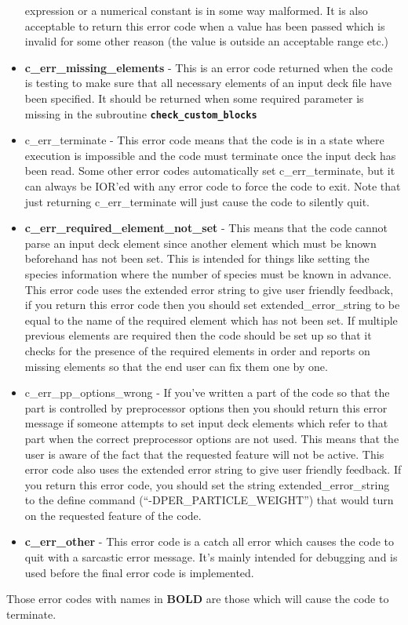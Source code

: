\documentclass[12pt,a4paper]{article}
\newcommand{\inlinecode}[1]{{\color{warwickred} \bf\texttt{#1}}}
\begin{document}
\begin{itemize}
  expression or a numerical constant is in some way malformed. It is also
  acceptable to return this error code when a value has been passed which is
  invalid for some other reason (the value is outside an acceptable range etc.)
\item {\bf c\_err\_missing\_elements} - This is an error code returned when the
  code is testing to make sure that all necessary elements of an input deck
  file have been specified. It should be returned when some required parameter
  is missing in the subroutine \inlinecode{check\_custom\_blocks}
\item c\_err\_terminate - This error code means that the code is in a state where
  execution is impossible and the code must terminate once the input deck has
  been read. Some other error codes automatically set c\_err\_terminate, but it
  can always be IOR'ed with any error code to force the code to exit. Note that
  just returning c\_err\_terminate will just cause the code to silently quit.
\item {\bf c\_err\_required\_element\_not\_set} - This means that the code cannot
  parse an input deck element since another element which must be known
  beforehand has not been set. This is intended for things like setting the
  species information where the number of species must be known in
  advance. This error code uses the extended error string to give user friendly
  feedback, if you return this error code then you should set
  extended\_error\_string to be equal to the name of the required element which
  has not been set. If multiple previous elements are required then the code
  should be set up so that it checks for the presence of the required elements
  in order and reports on missing elements so that the end user can fix them
  one by one.
\item c\_err\_pp\_options\_wrong - If you've written a part of the code so that
  the part is controlled by preprocessor options then you should return this
  error message if someone attempts to set input deck elements which refer to
  that part when the correct preprocessor options are not used. This means that
  the user is aware of the fact that the requested feature will not be
  active. This error code also uses the extended error string to give user
  friendly feedback. If you return this error code, you should set the string
  extended\_error\_string to the define command (``-DPER\_PARTICLE\_WEIGHT'')
  that would turn on the requested feature of the code.
\item {\bf c\_err\_other} - This error code is a catch all error which causes the
  code to quit with a sarcastic error message. It's mainly intended for
  debugging and is used before the final error code is implemented.
\end{itemize}

Those error codes with names in {\bf BOLD} are those which will cause the code
to terminate.
\end{document}
